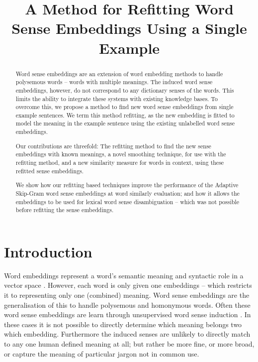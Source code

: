\documentclass{sig-alternate}
\begin{document}
\title{A Method for Refitting Word Sense Embeddings Using a Single Example}
\maketitle

\begin{abstract}
Word sense embeddings are an extension of word embedding methods to handle polysemous words -- words with multiple meanings. 
The induced word sense embeddings, however, do not correspond to any dictionary senses of the words.
This limits the ability to integrate these systems with existing knowledge bases.
To overcome this, we propose a method to find new word sense embeddings from single example sentences.
We term this method refitting, as the new embedding is fitted to model the meaning in the example sentence using the existing unlabelled word sense embeddings.

Our contributions are threefold:
The refitting method to find the new sense embeddings with known meanings,
a novel smoothing technique, for use with the refitting method,
and a new similarity measure for words in context, using these refitted sense embeddings.

We show how our refitting based techniques improve the performance of the Adaptive Skip-Gram word sense embeddings at word similarly evaluation; and how it allows the embeddings to be used for lexical word sense disambiguation -- which was not possible before refitting the sense embeddings.

\end{abstract}

\section{Introduction}


Word embeddings represent a word's semantic meaning and syntactic role in a vector space \parencite{NPLM, collobert2008unified, mikolov2013efficient}. However, each word is only given one embeddings -- which restricts it to representing only one (combined) meaning. Word sense embeddings are the generalisation of this to handle polysemous and homonymous  words. Often these word sense embeddings are learn through unsupervised word sense induction \parencite{Reisinger2010,Huang2012,tian2014probabilistic, AdaGrams}. In these cases it is not possible to directly determine which meaning belongs two which embedding. Furthermore the induced senses are unlikely to directly match to any one human defined meaning at all; but rather be more fine, or more broad, or capture the meaning of particular jargon not in common use.
\end{document}
